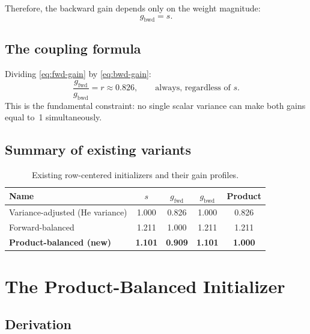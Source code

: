 \documentclass[11pt,a4paper]{article}
\theoremstyle{definition}
\begin{document}
Therefore, the backward gain depends only on the weight
magnitude:
\begin{equation}\label{eq:bwd-gain}
  \boxed{\;g_{\mathrm{bwd}} = s.\;}
\end{equation}

\subsection{The coupling formula}

Dividing \eqref{eq:fwd-gain} by \eqref{eq:bwd-gain}:
\begin{equation}\label{eq:coupling}
  \frac{g_{\mathrm{fwd}}}{g_{\mathrm{bwd}}} = r \approx 0.826,
  \qquad\text{always, regardless of } s.
\end{equation}
This is the fundamental constraint: no single scalar variance
can make both gains equal to~1 simultaneously.

\subsection{Summary of existing variants}
\label{sec:existing}

\begin{table}[H]
\centering
\caption{Existing row-centered initializers and their gain profiles.}
\label{tab:existing}
\begin{tabular}{l c c c c}
\toprule
Name & $s$ & $g_{\mathrm{fwd}}$ & $g_{\mathrm{bwd}}$ & Product \\
\midrule
Variance-adjusted (He variance) & 1.000 & 0.826 & 1.000 & 0.826 \\
Forward-balanced                & 1.211 & 1.000 & 1.211 & 1.211 \\
\textbf{Product-balanced (new)} & \textbf{1.101} & \textbf{0.909} & \textbf{1.101} & \textbf{1.000} \\
\bottomrule
\end{tabular}
\end{table}


\section{The Product-Balanced Initializer}
\label{sec:product-balanced}

\subsection{Derivation}
\end{document}
